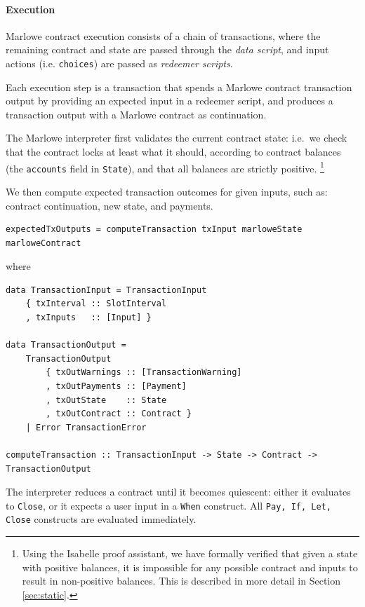 \documentclass[runningheads]{llncs}
\begin{document}
\paragraph{Execution}

Marlowe contract execution consists of a chain of transactions,
where the remaining contract and state are passed through the \emph{data script},
and input actions (i.e. \texttt{choices}) are passed as \emph{redeemer scripts}.

Each execution step is a transaction that spends a Marlowe contract transaction output by providing
an expected input in a redeemer script,
and produces a transaction output with a Marlowe contract as continuation.

The Marlowe interpreter first validates the current contract state: i.e.\
we check that the contract locks at least what it should, according
to contract balances (the \texttt{accounts} field in \texttt{State}),
and that all balances are strictly positive.
\footnote{
Using the Isabelle proof assistant, we have formally verified that given a state with positive balances,
it is impossible for any possible contract and inputs to result in non-positive balances.
This is described in more detail in Section \ref{sec:static}.}

We then compute expected transaction outcomes for given inputs, such as:
contract continuation, new state, and payments.

\begin{verbatim}
expectedTxOutputs = computeTransaction txInput marloweState marloweContract
\end{verbatim}

\noindent
where

\begin{verbatim}
data TransactionInput = TransactionInput
    { txInterval :: SlotInterval
    , txInputs   :: [Input] }

data TransactionOutput =
    TransactionOutput
        { txOutWarnings :: [TransactionWarning]
        , txOutPayments :: [Payment]
        , txOutState    :: State
        , txOutContract :: Contract }
    | Error TransactionError

computeTransaction :: TransactionInput -> State -> Contract -> TransactionOutput
\end{verbatim}

\noindent
The interpreter reduces a contract until it becomes quiescent: either it evaluates to \texttt{Close},
or it expects a user input in a \texttt{When} construct.
All \texttt{Pay, If, Let, Close} constructs are evaluated immediately.
\end{document}
